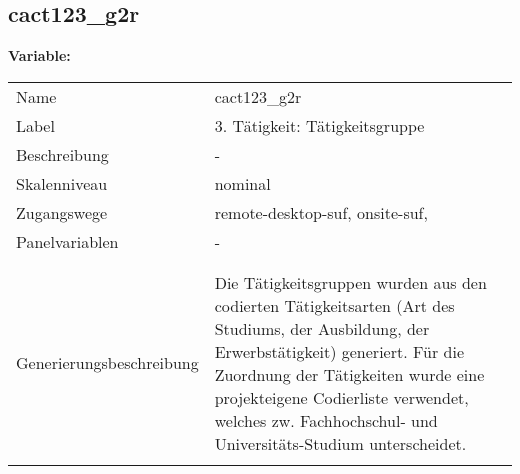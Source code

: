 	
	
	\subsection{cact123\_g2r}
	\label{subSection:cact123_g2r}

	\noindent\textbf{Variable:}\\
		\begin{tabular}{lL{11.3cm}}
			\label{tableVariable:cact123_g2r}
			Name & cact123\_g2r \\
			Label & 3. Tätigkeit: Tätigkeitsgruppe  \\
			Beschreibung & - \\
			Skalenniveau & nominal \\
			Zugangswege &
				remote-desktop-suf,
				onsite-suf,
 \\
			Panelvariablen & -
			 \\
			 \\
 \\
					Generierungsbeschreibung & Die Tätigkeitsgruppen wurden aus den codierten Tätigkeitsarten (Art des Studiums, der Ausbildung, der Erwerbstätigkeit) generiert. Für die Zuordnung der Tätigkeiten wurde eine projekteigene Codierliste verwendet, welches zw. Fachhochschul- und Universitäts-Studium unterscheidet.
				 \\	
			 \\
		\end{tabular}






